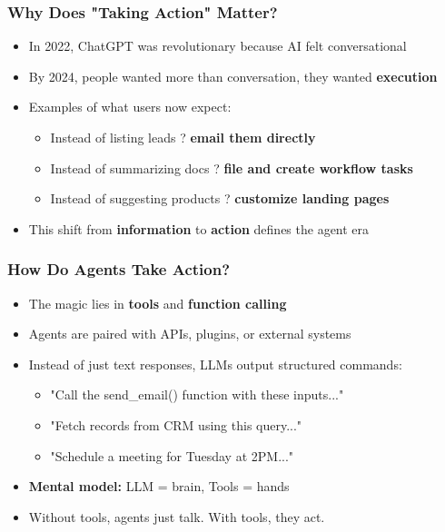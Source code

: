 \begin{frame}[fragile]\frametitle{Why Does "Taking Action" Matter?}
\begin{itemize}
    \item In 2022, ChatGPT was revolutionary because AI felt conversational
    \item By 2024, people wanted more than conversation, they wanted \textbf{execution}
    \item Examples of what users now expect:
    \begin{itemize}
        \item Instead of listing leads ? \textbf{email them directly}
        \item Instead of summarizing docs ? \textbf{file and create workflow tasks}
        \item Instead of suggesting products ? \textbf{customize landing pages}
    \end{itemize}
    \item This shift from \textbf{information} to \textbf{action} defines the agent era
\end{itemize}
\end{frame}

\begin{frame}[fragile]\frametitle{How Do Agents Take Action?}
\begin{itemize}
    \item The magic lies in \textbf{tools} and \textbf{function calling}
    \item Agents are paired with APIs, plugins, or external systems
    \item Instead of just text responses, LLMs output structured commands:
    \begin{itemize}
        \item "Call the send\_email() function with these inputs..."
        \item "Fetch records from CRM using this query..."
        \item "Schedule a meeting for Tuesday at 2PM..."
    \end{itemize}
    \item \textbf{Mental model:} LLM = brain, Tools = hands
    \item Without tools, agents just talk. With tools, they act.
\end{itemize}
\end{frame}

